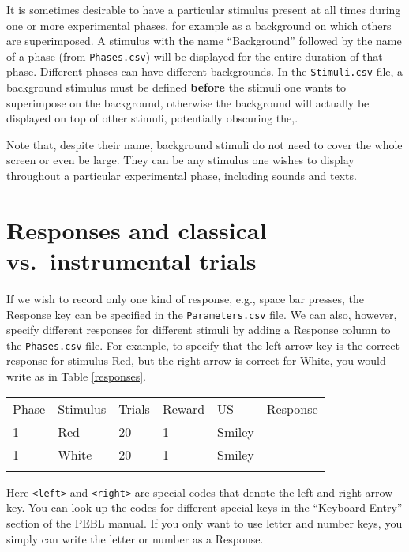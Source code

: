 \documentclass[11pt,]{article}
\renewcommand{\medskip}{}
\begin{document}
It is sometimes desirable to have a particular stimulus present at all
times during one or more experimental phases, for example as a
background on which others are superimposed. A stimulus with the name
``Background'' followed by the name of a phase (from
\texttt{Phases.csv}) will be displayed for the entire duration of that
phase. Different phases can have different backgrounds. In the
\texttt{Stimuli.csv} file, a background stimulus must be defined
\textbf{before} the stimuli one wants to superimpose on the background,
otherwise the background will actually be displayed on top of other
stimuli, potentially obscuring the,.

Note that, despite their name, background stimuli do not need to cover
the whole screen or even be large. They can be any stimulus one wishes
to display throughout a particular experimental phase, including sounds
and texts.

\section{Responses and classical vs.~instrumental trials}

If we wish to record only one kind of response, e.g., space bar presses,
the Response key can be specified in the \texttt{Parameters.csv} file.
We can also, however, specify different responses for different stimuli
by adding a Response column to the \texttt{Phases.csv} file. For
example, to specify that the left arrow key is the correct response for
stimulus Red, but the right arrow is correct for White, you would write
as in Table \ref{responses}.

\begin{table*}[t]\begin{center}\small\begin{tabular}{@{}llllll@{}}
\hline\noalign{\medskip}
Phase & Stimulus & Trials & Reward & US & Response
\\\noalign{\medskip}
\hline\noalign{\medskip}
1 & Red & 20 & 1 & Smiley &
\\\noalign{\medskip}
1 & White & 20 & 1 & Smiley &
\\\noalign{\medskip}
\hline
\noalign{\medskip}
\end{tabular}\caption{A \texttt{Phases.csv} specifying different responses for
stimuli Red and White. \label{responses}}
\end{center}\end{table*}

Here \texttt{\textless{}left\textgreater{}} and
\texttt{\textless{}right\textgreater{}} are special codes that denote
the left and right arrow key. You can look up the codes for different
special keys in the ``Keyboard Entry'' section of the PEBL manual. If
you only want to use letter and number keys, you simply can write the
letter or number as a Response.
\end{document}
